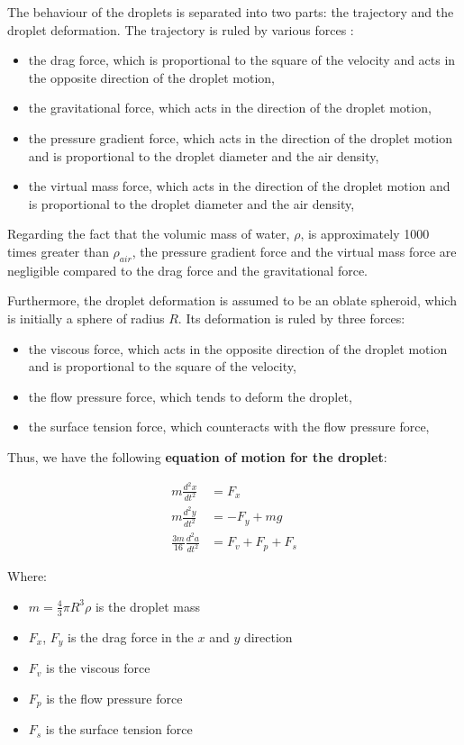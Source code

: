 \documentclass[10pt]{report}
\begin{document}
    \par The behaviour of the droplets is separated into two parts: the trajectory and the droplet deformation. The trajectory is ruled by various forces : 
\begin{itemize}
    \item the drag force, which is proportional to the square of the velocity and acts in the opposite direction of the droplet motion,
    \item the gravitational force, which acts in the direction of the droplet motion,
    \item the pressure gradient force, which acts in the direction of the droplet motion and is proportional to the droplet diameter and the air density,
    \item the virtual mass force, which acts in the direction of the droplet motion and is proportional to the droplet diameter and the air density,
\end{itemize}
\par Regarding the fact that the volumic mass of water, $\rho$, is approximately 1000 times greater than $\rho_{air}$, the pressure gradient force and the virtual mass force are negligible compared to the drag force and the gravitational force. 

\vspace{5mm}
Furthermore, the droplet deformation is assumed to be an oblate spheroid, which is initially a sphere of radius $R$. Its deformation is ruled by three forces:
\begin{itemize}
    \item the viscous force, which acts in the opposite direction of the droplet motion and is proportional to the square of the velocity,
    \item the flow pressure force, which tends to deform the droplet,
    \item the surface tension force, which counteracts with the flow pressure force,
\end{itemize}

Thus, we have the following \textbf{equation of motion for the droplet}:

\begin{align}
    m\frac{d^2x}{dt^2} &=  F_x \\
    m\frac{d^2y}{dt^2} &= -F_y + mg \\
    \frac{3m}{16}\frac{d^2a}{dt^2} &= F_v + F_p + F_s 
\end{align}

Where:
\begin{itemize}
    \item $m = \frac{4}{3}\pi R^3 \rho$ is the droplet mass
    \item $F_x$, $F_y$ is the drag force in the $x$ and $y$ direction
    \item $F_v$ is the viscous force
    \item $F_p$ is the flow pressure force
    \item $F_s$ is the surface tension force
\end{itemize}\par 
\end{document}
